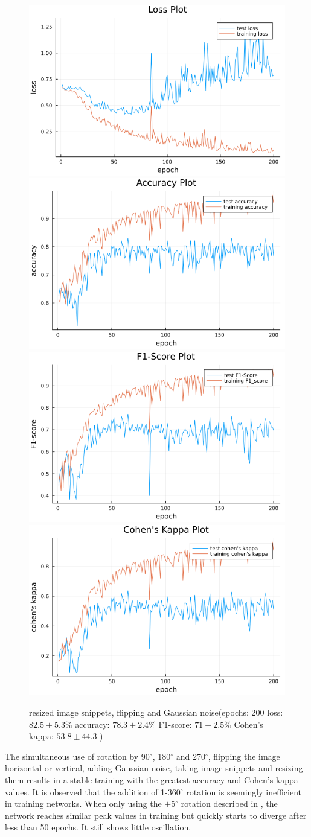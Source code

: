 \documentclass[
a4paper, 
12pt,
grayscalebody, %
abstract=on,
twoside, BCOR10mm, 12pt, DIV13,headinclude, footexclude, final, abstracton, openright
]{ibireprt}
\numberwithin{equation}{chapter}
\numberwithin{table}{chapter}
\numberwithin{figure}{chapter}
\numberwithin{algorithm}{chapter}
\numberwithin{example}{chapter}
\numberwithin{example}{chapter}
\begin{document}
\begin{figure}
	\includegraphics[width=0.4\linewidth]{loss_png_final_run_0_6.png}\hfill
	\includegraphics[width=0.4\linewidth]{accuracy_png_final_run_0_6.png}
	\\[\smallskipamount]
	\includegraphics[width=0.4\linewidth]{f1_score_png_final_run_0_6.png}\hfill
	\includegraphics[width=0.4\linewidth]{cohens_kappa_png_final_run_0_6.png}
	\caption{resized image snippets, flipping and Gaussian noise(epochs: 200 loss: $82.5\pm5.3\% $ accuracy: $78.3\pm2.4\%$ F1-score: $71\pm2.5\%$  Cohen's kappa: $53.8\pm44.3$ )}
\end{figure}%

	\clearpage

The simultaneous use of rotation by 90$^{\circ}$, 180$^{\circ}$ and 270$^{\circ}$, flipping the image horizontal or vertical, adding Gaussian noise, taking image snippets and resizing them results in a stable training with the greatest accuracy and Cohen's kappa values. It is observed that the addition of 1-360$^{\circ}$ rotation is seemingly inefficient in training networks. When only using the $\pm$5$^{\circ}$ rotation described in \citet{Zhang2020}, the network reaches similar peak values in training but quickly starts to diverge after less than 50 epochs. It still shows little oscillation.
\end{document}
